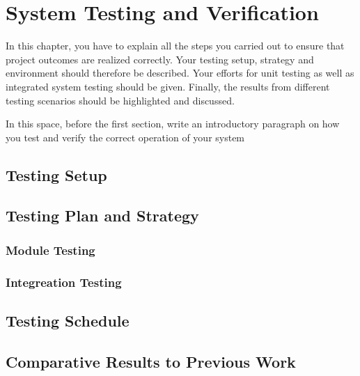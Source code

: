 \section{System Testing and Verification}
In this chapter, you have to explain all the steps you carried out to ensure that project outcomes are realized correctly. Your testing setup, strategy and environment should therefore be described. Your efforts for unit testing as well as integrated system testing should be given. Finally, the results from different testing scenarios should be highlighted and discussed. 

In this space, before the first section, write an introductory paragraph on how you test and verify the correct operation of your system

\subsection{Testing Setup}

\subsection{Testing Plan and Strategy}

\subsubsection{Module Testing}
\subsubsection{Integreation Testing}

\subsection{Testing Schedule}

\subsection{Comparative Results to Previous Work}
